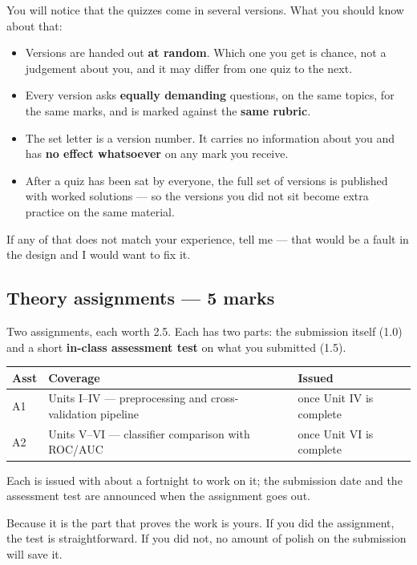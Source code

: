 \documentclass[11pt]{article}
\begin{document}
You will notice that the quizzes come in several versions. What you should know
about that:

\begin{itemize}[leftmargin=*]
  \item Versions are handed out \textbf{at random}. Which one you get is chance,
    not a judgement about you, and it may differ from one quiz to the next.
  \item Every version asks \textbf{equally demanding} questions, on the same
    topics, for the same marks, and is marked against the \textbf{same rubric}.
  \item The set letter is a version number. It carries no information about you
    and has \textbf{no effect whatsoever} on any mark you receive.
  \item After a quiz has been sat by everyone, the full set of versions is
    published with worked solutions --- so the versions you did not sit become
    extra practice on the same material.
\end{itemize}

If any of that does not match your experience, tell me --- that would be a fault
in the design and I would want to fix it.

\subsection{Theory assignments --- 5 marks}

Two assignments, each worth 2.5. Each has two parts: the submission itself
(1.0) and a short \textbf{in-class assessment test} on what you submitted (1.5).

\begin{center}
\begin{tabular}{@{}lp{8.4cm}l@{}}
\toprule
\textbf{Asst} & \textbf{Coverage} & \textbf{Issued}\\
\midrule
A1 & Units I--IV --- preprocessing and cross-validation pipeline & once Unit IV is complete\\
A2 & Units V--VI --- classifier comparison with ROC/AUC & once Unit VI is complete\\
\bottomrule
\end{tabular}
\end{center}

\noindent Each is issued with about a fortnight to work on it; the submission
date and the assessment test are announced when the assignment goes out.

\begin{caution}
Because it is the part that proves the work is yours. If you did the assignment,
the test is straightforward. If you did not, no amount of polish on the
submission will save it.
\end{caution}
\end{document}
